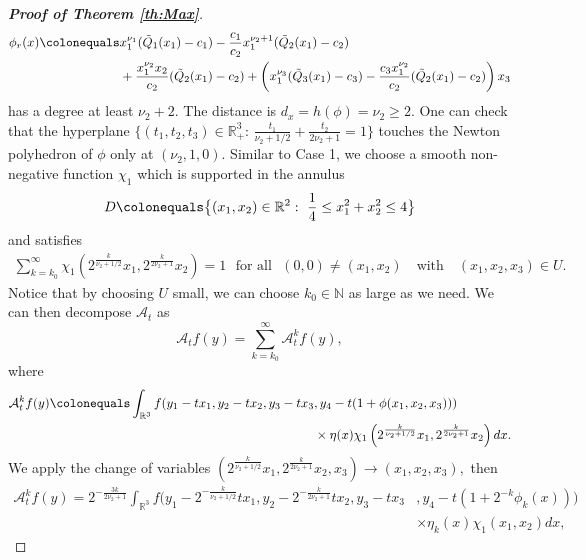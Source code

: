 \documentclass[a4paper, 11pt]{article}
\theoremstyle{plain}
\theoremstyle{definition}
\theoremstyle{lemma}
\theoremstyle{Remark}
\theoremstyle{proposition}
\theoremstyle{corollary}
\theoremstyle{example}
\theoremstyle{assumption}
\begin{document}
\begin{proof}[\textbf{Proof of Theorem \ref{th:Max}}]
\begin{align*}
\phi_r(x)\colonequals & x_1^{\nu_1}(\tilde Q_1(x_1)-c_1)-\frac{c_1}{c_2}x_1^{\nu_2+1}(\tilde Q_2(x_1)-c_2) \\& +\frac{x_1^{\nu_2}x_2}{c_2}(\tilde Q_2(x_1)-c_2)+\left(x_1^{\nu_3}(\tilde Q_3(x_1)-c_3)-\frac{c_3x_1^{\nu_2} }{c_2}(\tilde Q_2(x_1)-c_2)\right)x_3
\end{align*}
has a degree at least $\nu_2+2.$ The distance is   $d_x=h(\phi)=\nu_2\ge 2.$
One can check that the hyperplane $\{(t_1, t_2, t_3)\in \mathbb{R}^3_{+}:\,\frac{t_1}{\nu_2+1/2}+\frac{t_2}{2\nu_2+1}=1\}$  touches  the Newton polyhedron of $\phi$ only at $(\nu_2,1,0).$ %
Similar to Case 1, we choose a smooth non-negative function $\chi_1$ which is
 supported in the annulus
\begin{eqnarray*}
D\colonequals \big\{(x_1,x_2)\in \mathbb{R}^2:\,\,\frac{1}{4}\leq x_1^2+x_2^2\leq 4\big\}
\end{eqnarray*}
and satisfies
\begin{eqnarray*}
\sum_{k=k_0}^{\infty} \chi_1\left(2^{\frac{k}{\nu_2+1/2}}x_1, 2^{\frac{k}{2\nu_2+1}}x_2\right)=1\,\,\,\,\text{for all}\,\,\,\, (0, 0)\neq (x_1, x_2)\quad \mbox{with} \quad (x_1, x_2, x_3) \in U.
\end{eqnarray*}
 Notice that by choosing $U$ small, we can choose $k_0\in \mathbb{N}$ as large as we need. We can then decompose $\mathcal{A}_t$  as
$$\mathcal{A}_tf(y)=\sum_{k=k_0}^{\infty} \mathcal{A}_t^k f(y), $$
where
\begin{align*}
 \mathcal{A}_t^k f(y)\colonequals \int_{\mathbb{R}^3}f(y_1-tx_1,y_2-tx_2,y_3-tx_3 &, y_4-t(1+ \phi(x_1,x_2,x_3))) \\
 &\times \eta(x)\chi_1\left(2^{\frac{k}{\nu_2+1/2}}x_1, 2^{\frac{k}{2\nu_2+1}}x_2\right)dx.
\end{align*}
We apply the  change of variables $(2^{\frac{k}{\nu_2+1/2}}x_1, 2^{\frac{k}{2\nu_2+1}}x_2, x_3)\to (x_1, x_2, x_3) ,$ then
\begin{align*}
 \mathcal{A}_t^k f(y)= 2^{-\frac{3k}{2\nu_2+1}}\int_{\mathbb{R}^3}f(y_1-2^{-\frac{k}{\nu_2+1/2}}tx_1, y_2-2^{-\frac{k}{2\nu_2+1}}tx_2, y_3- tx_3&, y_4-t(1+ 2^{-k}\phi_k(x)))\\
 &\times  \eta_k(x)\chi_1(x_1, x_2)dx,
 \end{align*}

\end{proof}
\end{document}
